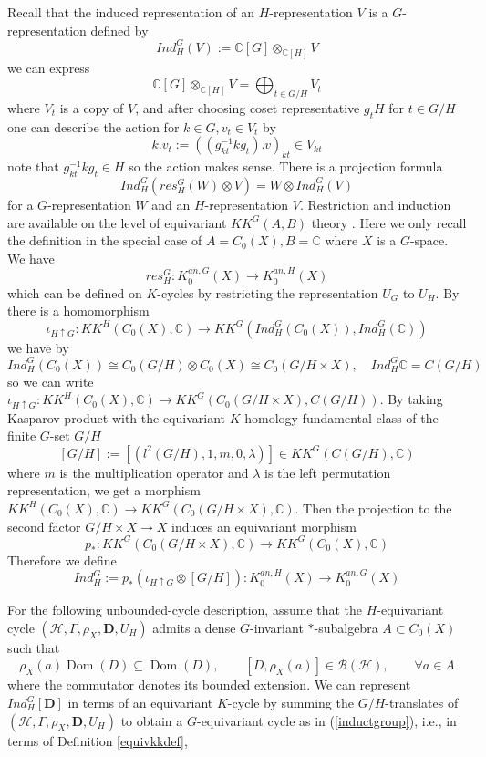 \documentclass[11pt,leqno,twoside]{amsart}
\theoremstyle{plainsl}
\theoremstyle{definition}
\newcommand{\C}{\mathbb{C}}
\newcommand{\bD}{\mathbf{D}}
\begin{document}
Recall that the induced representation of an $H$-representation $V$  is a $G$-representation defined by $$Ind_H^G(V):=\C[G]\otimes_{\C [H]} V$$ 
we can express
\begin{equation}\label{inductgroup}
    \C[G]\otimes_{\C [H]} V=\bigoplus_{t\in G/H} V_{t}
\end{equation}
where $V_{t}$ is a copy of $V$, and after choosing coset representative $g_tH$ for $t\in G/H$ one can describe the action 
 for $k\in G, v_t\in V_t$ by \cite[Def.~1.12.2]{Sag}
\[k. v_{t}:=((g^{-1}_{kt}kg_t).v)_{kt}  \in V_{kt}\]
note that $g^{-1}_{kt}kg_t\in H$  so the action makes sense.
There is a projection formula
\begin{equation}\label{projectiongroup}
    Ind^G_H(res^G_H(W)\otimes V)=W\otimes Ind^G_H(V)
\end{equation}
for a $G$-representation $W$ and an $H$-representation $V$. Restriction and induction are available on the level of equivariant $KK^G(A,B)$ theory \cite[\S~20.5]{Bl}. Here we only recall the definition in the special case of $A=C_0(X), B=\C$ where $X$ is a $G$-space. We have
\[res^G_H:K_0^{an,G}(X)\rightarrow K_0^{an,H}(X)\]
which can be defined on $K$-cycles by restricting the representation $U_G$ to $U_H$.
 By \cite[Thm~20.5.4]{Bl} there is a homomorphism 
\[\iota_{H\uparrow G}:KK^H(C_0(X),\C)\rightarrow KK^G(Ind^G_{H}(C_0(X)),Ind^G_{H}(\C))\]
we have by \cite[Example~20.5.3 (b)]{Bl} $$Ind^G_H(C_0(X))\cong C_0(G/H)\otimes C_0(X)\cong C_0(G/H\times X),\quad Ind^G_H \C=C(G/H)$$ so we can write
$\iota_{H\uparrow G}:KK^H(C_0(X),\C)\rightarrow KK^G(C_0(G/H\times X),C(G/H))$.
By taking  Kasparov product with the equivariant $K$-homology  fundamental class of the finite \(G\)-set $G/H$
\[[G/H]:=[(l^2(G/H),1,m,0,\lambda)]\in KK^G(C(G/H),\C)\]
where $m$ is the multiplication operator and $\lambda$ is the left permutation representation,
we get a morphism $KK^H(C_0(X),\C)\rightarrow KK^G(C_0(G/H\times X),\C)$. Then the projection to the second factor $G/H\times X\rightarrow X$ induces an equivariant  morphism $$p_*:KK^G(C_0(G/H\times X),\C) \rightarrow KK^G(C_0(X),\C)$$ Therefore we define
\begin{equation}\label{inductform}
    Ind_H^G:=  p_*( \iota_{H\uparrow G} \otimes [G/H]):      K_0^{an,H}(X)\rightarrow K_0^{an,G}(X)
\end{equation}


For the following unbounded-cycle description, assume that
the $H$-equivariant cycle
$(\mathcal H,\Gamma,\rho_X,\bD,U_H)$ admits a dense
$G$-invariant $\ast$-subalgebra $A\subset C_0(X)$ such that
\[
\rho_X(a)\operatorname{Dom}(D)\subseteq\operatorname{Dom}(D),
\qquad
[D,\rho_X(a)]\in\mathcal B(\mathcal H),
\qquad \forall a\in A
\]
where the commutator denotes its bounded extension. We can represent $Ind^G_H[\bD]$ in terms of an equivariant $K$-cycle  by summing the $G/H$-translates of $(\mathcal H,\Gamma,\rho_X,\bD,U_H)$ to obtain a $G$-equivariant cycle as in (\ref{inductgroup}), i.e., in terms of Definition \ref{equivkkdef},
\end{document}
